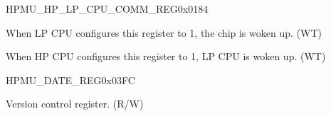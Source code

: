 \begin{register}{H}{PMU\_HP\_LP\_CPU\_COMM\_REG}{0x0184}\label{regdesc:PMUHPLPCPUCOMMREG}
%
%
%
\regnewline%
\begin{regdesc}\begin{reglist}
\label{fielddesc:PMULPTRIGGERHP}\item [PMU\_LP\_TRIGGER\_HP] When LP CPU configures this register to 1, the chip is woken up. (WT)
\label{fielddesc:PMUHPTRIGGERLP}\item [PMU\_HP\_TRIGGER\_LP] When HP CPU configures this register to 1, LP CPU is woken up. (WT)
\end{reglist}\end{regdesc}
\end{register}

\begin{register}{H}{PMU\_DATE\_REG}{0x03FC}\label{regdesc:PMUDATEREG}
%
%
\regnewline%
\begin{regdesc}\begin{reglist}
\label{fielddesc:PMUPMUDATE}\item [PMU\_PMU\_DATE] Version control register. (R/W)
\end{reglist}\end{regdesc}
\end{register}
